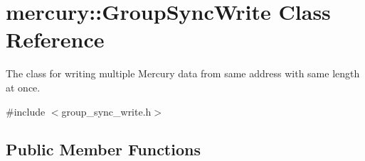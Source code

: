 \hypertarget{classmercury_1_1_group_sync_write}{}\section{mercury\+:\+:Group\+Sync\+Write Class Reference}
\label{classmercury_1_1_group_sync_write}


The class for writing multiple Mercury data from same address with same length at once.  




{\ttfamily \#include $<$group\+\_\+sync\+\_\+write.\+h$>$}

\subsection*{Public Member Functions}
